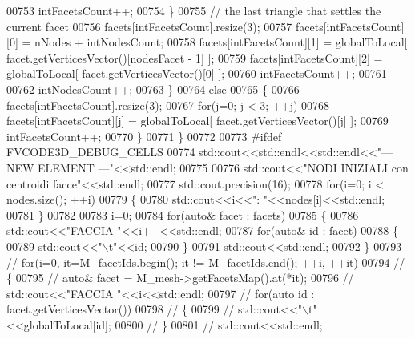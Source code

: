 \begin{DoxyCode}
00753                     intFacetsCount++;
00754                 \}
00755                 \textcolor{comment}{// the last triangle that settles the current facet}
00756                 facets[intFacetsCount].resize(3);
00757                 facets[intFacetsCount][0] = nNodes + intNodesCount;
00758                 facets[intFacetsCount][1] = globalToLocal[ facet.getVerticesVector()[nodesFacet - 1] ];
00759                 facets[intFacetsCount][2] = globalToLocal[ facet.getVerticesVector()[0] ];
00760                 intFacetsCount++;
00761 
00762                 intNodesCount++;
00763             \}
00764             \textcolor{keywordflow}{else}
00765             \{
00766                 facets[intFacetsCount].resize(3);
00767                 \textcolor{keywordflow}{for}(j=0; j < 3; ++j)
00768                     facets[intFacetsCount][j] = globalToLocal[ facet.getVerticesVector()[j] ];
00769                 intFacetsCount++;
00770             \}
00771         \}
00772 
00773 \textcolor{preprocessor}{#ifdef FVCODE3D\_DEBUG\_CELLS}
00774         std::cout<<std::endl<<std::endl<<\textcolor{stringliteral}{"--- NEW ELEMENT ---"}<<std::endl;
00775 
00776         std::cout<<\textcolor{stringliteral}{"NODI INIZIALI con centroidi facce"}<<std::endl;
00777         std::cout.precision(16);
00778         \textcolor{keywordflow}{for}(i=0; i < nodes.size(); ++i)
00779         \{
00780             std::cout<<i<<\textcolor{stringliteral}{": "}<<nodes[i]<<std::endl;
00781         \}
00782 
00783         i=0;
00784         \textcolor{keywordflow}{for}(\textcolor{keyword}{auto}& facet : facets)
00785         \{
00786             std::cout<<\textcolor{stringliteral}{"FACCIA "}<<i++<<std::endl;
00787             \textcolor{keywordflow}{for}(\textcolor{keyword}{auto}& \textcolor{keywordtype}{id} : facet)
00788             \{
00789                 std::cout<<\textcolor{stringliteral}{"\(\backslash\)t"}<<id;
00790             \}
00791             std::cout<<std::endl;
00792         \}
00793 \textcolor{comment}{//        for(i=0, it=M\_facetIds.begin(); it != M\_facetIds.end(); ++i, ++it)}
00794 \textcolor{comment}{//        \{}
00795 \textcolor{comment}{//            auto& facet = M\_mesh->getFacetsMap().at(*it);}
00796 \textcolor{comment}{//            std::cout<<"FACCIA "<<i<<std::endl;}
00797 \textcolor{comment}{//            for(auto id : facet.getVerticesVector())}
00798 \textcolor{comment}{//            \{}
00799 \textcolor{comment}{//                std::cout<<"\(\backslash\)t"<<globalToLocal[id];}
00800 \textcolor{comment}{//            \}}
00801 \textcolor{comment}{//            std::cout<<std::endl;}

\end{DoxyCode}
